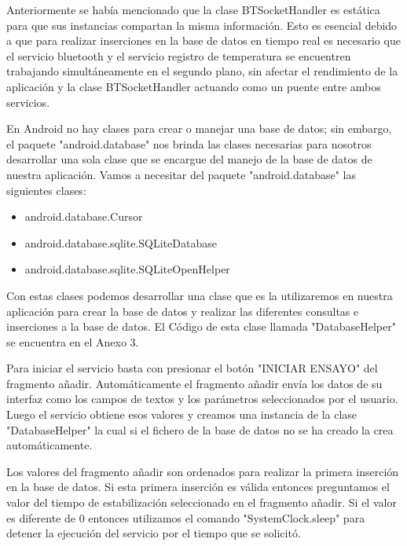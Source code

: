 \par \noindent
Anteriormente se había mencionado que la clase BTSocketHandler es estática para que sus instancias compartan la misma información. Esto es esencial debido a que para realizar inserciones en la base de datos en tiempo real es necesario que el servicio bluetooth y el servicio registro de temperatura se encuentren trabajando simultáneamente en el segundo plano, sin afectar el rendimiento de la aplicación y la clase BTSocketHandler actuando como un puente entre ambos servicios.

\par \noindent
En Android no hay clases para crear o manejar una base de datos; sin embargo, el paquete "android.database" nos brinda las clases necesarias para nosotros desarrollar una sola clase que se encargue del manejo de la base de datos de nuestra aplicación. Vamos a necesitar del paquete "android.database" las siguientes clases:

\begin{itemize}
	
	\item android.database.Cursor
	
	\item android.database.sqlite.SQLiteDatabase
	
	\item android.database.sqlite.SQLiteOpenHelper
	
\end{itemize} 

\par \noindent
Con estas clases podemos desarrollar una clase que es la utilizaremos en nuestra aplicación para crear la base de datos y realizar las diferentes consultas e inserciones a la base de datos. El Código de esta clase llamada "DatabaseHelper" se encuentra en el Anexo 3.

\par \noindent
Para iniciar el servicio basta con presionar el botón "INICIAR ENSAYO" del fragmento añadir. Automáticamente el fragmento añadir envía los datos de su interfaz como los campos de textos y los parámetros seleccionados por el usuario. Luego el servicio obtiene esos valores y creamos una instancia de la clase "DatabaseHelper" la cual si el fichero de la base de datos no se ha creado la crea automáticamente. 

\par \noindent
Los valores del fragmento añadir son ordenados para realizar la primera inserción en la base de datos. Si esta primera inserción es válida entonces preguntamos el valor del tiempo de estabilización seleccionado en el fragmento añadir. Si el valor es diferente de 0 entonces utilizamos el comando "SystemClock.sleep" para detener la ejecución del servicio por el tiempo que se solicitó.

